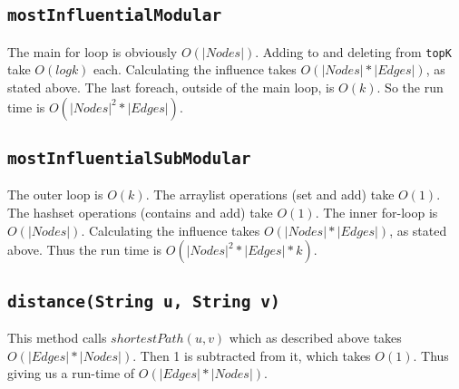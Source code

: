 \documentclass[10pt,letterpaper]{article}
\begin{document}
\subsection{\texttt{mostInfluentialModular}}
The main for loop is obviously $O(|Nodes|)$. Adding to and deleting from \texttt{topK} take $O(log k)$ each. Calculating the influence takes $O(|Nodes|*|Edges|)$, as stated above. The last foreach, outside of the main loop, is $O(k)$. So the run time is $O(|Nodes|^2*|Edges|)$.
\subsection{\texttt{mostInfluentialSubModular}}
The outer loop is $O(k)$. The arraylist operations (set and add) take $O(1)$. The hashset operations (contains and add) take $O(1)$. The inner for-loop is $O(|Nodes|)$. Calculating the influence takes $O(|Nodes|*|Edges|)$, as stated above. Thus the run time is $O(|Nodes|^2*|Edges|*k)$.
\subsection{\texttt{distance(String u, String v)}}
This method calls $shortestPath(u, v)$ which as described above takes $O(|Edges| * |Nodes|)$. Then 1 is subtracted from it, which takes $O(1)$. Thus giving us a run-time of $O(|Edges| * |Nodes|)$.
\end{document}

